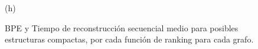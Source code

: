 \begin{figure}
\begin{minipage}{1\textwidth}
\begin{minipage}{0.45\textwidth}
\begin{minipage}{0.2\textwidth}
    			\end{minipage}
    			
    			(h)
    		\end{minipage}  
    	\end{minipage}    	
    	
    	
%    		
    	 
    \caption{BPE y Tiempo de reconstrucción secuencial medio para posibles estructuras compactas, por cada función de ranking para cada grafo.}
    \label{fig:sdslBPE}
\end{figure}
